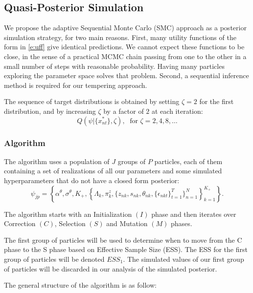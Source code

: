 \documentclass[12pt]{article}
\newcounter{thm}[section]
\begin{document}
\subsection{Quasi-Posterior Simulation}

We propose the adaptive Sequential Monte Carlo (SMC) approach \citep{DurhamGeweke2013} as a posterior simulation strategy, for two main reasons.
First, many utility functions of the form in \eqref{e:uff} give identical predictions.
We cannot expect these functions to be close, in the sense of a practical MCMC chain passing from one to the other in a small number of steps with reasonable probability. Having many particles exploring the parameter space solves that problem.
Second, a sequential inference method is required for our tempering approach.

The sequence of target distributions is obtained by setting $\zeta=2$ for the first distribution, and by increasing $\zeta$ by a factor of $2$ at each iteration:
$$ Q(\psi|\{x_{nt}^*\},\zeta), \; \text{ for } \zeta=2,4,8,\ldots $$ 


\subsubsection{Algorithm}

The algorithm uses a population of $J$ groups of $P$ particles, each of them containing a set of realizations of all our parameters and some simulated hyperparameters that do not have a closed form posterior: $$\psi_{jp} = \left\{\alpha^\theta, \sigma^\theta, K_+,\left\{\Lambda_k, \pi^z_k, \{z_{nk},s_{nk},\theta_{nk},\{\epsilon_{nkt}\}_{t=1}^T \}_{n=1}^N \right\}_{k=1}^{K_+} \right\}.$$

The algorithm starts with an Initialization $(I)$ phase and then iterates over Correction $(C)$, Selection $(S)$ and Mutation $(M)$ phases. 

The first group of particles will be used to determine when to move from the C phase to the S phase based on Effective Sample Size (ESS). The ESS for the first group of particles will be denoted $ESS_1$. The simulated values of our first group of particles will be discarded in our analysis of the simulated posterior.  

The general structure of the algorithm is as follow:
\end{document}
